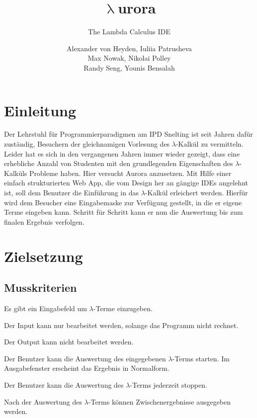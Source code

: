 \documentclass[parskip=full,11pt,twoside]{scrartcl}
\title{\textbf{$\uplambda$}urora}
\subtitle{The Lambda Calculus IDE}
\author{Alexander von Heyden, Iuliia Patrusheva\\
 Max Nowak, Nikolai Polley\\
 Randy Seng, Younis Bensalah}
\begin{document}
\maketitle
\newpage
\tableofcontents

\newpage
\section{Einleitung}
Der Lehrstuhl für Programmierparadigmen am IPD Snelting ist seit Jahren dafür zuständig, Besuchern der gleichnamigen Vorlesung des $\lambda$-Kalkül zu vermitteln. Leider hat es sich in den vergangenen Jahren immer wieder gezeigt, dass eine erhebliche Anzahl von Studenten mit den grundlegenden Eigenschaften des $\lambda$-Kalküls Probleme haben. Hier versucht Aurora anzusetzen. Mit Hilfe einer einfach strukturierten Web App, die vom Design her an gängige IDEs angelehnt ist, soll dem Benutzer die Einführung in das $\lambda$-Kalkül erleichert werden. Hierfür wird dem Besucher eine Eingabemaske zur Verfügung gestellt, in die er eigene Terme eingeben kann. Schritt für Schritt kann er nun die Auswertung bis zum finalen Ergebnis verfolgen.


\newpage
\section{Zielsetzung}


\subsection{Musskriterien}

Es gibt ein Eingabefeld um $\lambda$-Terme einzugeben.

Der Input kann nur bearbeitet werden, solange das Programm nicht rechnet.

Der Output kann nicht bearbeitet werden.

Der Benutzer kann die Auswertung des eingegebenen $\lambda$-Terms starten. Im Ausgabefenster erscheint das Ergebnis in Normalform.

Der Benutzer kann die Auswertung des $\lambda$-Terms jederzeit stoppen.

Nach der Auswertung des $\lambda$-Terms können Zwischenergebnisse ausgegeben werden.
\end{document}
